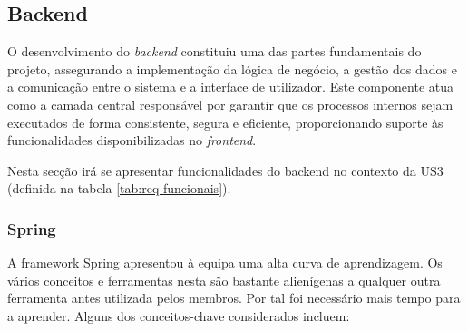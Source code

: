 \subsection{Backend}

O desenvolvimento do \textit{backend} constituiu uma das partes fundamentais do projeto, assegurando a implementação da lógica de negócio, a gestão dos dados e a comunicação entre o sistema e a interface de utilizador. Este componente atua como a camada central responsável por garantir que os processos internos sejam executados de forma consistente, segura e eficiente, proporcionando suporte às funcionalidades disponibilizadas no \textit{frontend}.  

Nesta secção irá se apresentar funcionalidades do backend no contexto da US3 (definida na tabela \ref{tab:req-funcionais}).







\subsubsection{Spring}
\label{sec:backend-Spring}

A framework Spring apresentou à equipa uma alta curva de aprendizagem. Os vários conceitos e ferramentas nesta são bastante alienígenas a qualquer outra ferramenta antes utilizada pelos membros. Por tal foi necessário mais tempo para a aprender. Alguns dos conceitos-chave considerados incluem:

